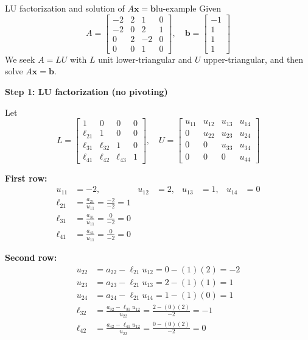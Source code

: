 \begin{example}{LU factorization and solution of $A\mathbf{x} = \mathbf{b}$}{lu-example}
Given
\[
A = \begin{bmatrix}
-2 & 2 & 1 & 0 \\
-2 & 0 & 2 & 1 \\
0 & 2 & -2 & 0 \\
0 & 0 & 1 & 0
\end{bmatrix},
\quad
\mathbf{b} = \begin{bmatrix}
-1 \\ 1 \\ 1 \\ 1
\end{bmatrix}
\]
We seek $A = LU$ with $L$ unit lower-triangular and $U$ upper-triangular, and then solve $A\mathbf{x} = \mathbf{b}$.

\textbf{Step 1: LU factorization (no pivoting)}

Let
\[
L = \begin{bmatrix}
1 & 0 & 0 & 0 \\
\ell_{21} & 1 & 0 & 0 \\
\ell_{31} & \ell_{32} & 1 & 0 \\
\ell_{41} & \ell_{42} & \ell_{43} & 1
\end{bmatrix},
\quad
U = \begin{bmatrix}
u_{11} & u_{12} & u_{13} & u_{14} \\
0 & u_{22} & u_{23} & u_{24} \\
0 & 0 & u_{33} & u_{34} \\
0 & 0 & 0 & u_{44}
\end{bmatrix}
\]

\textbf{First row:}
\begin{align*}
u_{11} &= -2, & u_{12} &= 2, & u_{13} &= 1, & u_{14} &= 0 \\
\ell_{21} &= \frac{a_{21}}{u_{11}} = \frac{-2}{-2} = 1 \\
\ell_{31} &= \frac{a_{31}}{u_{11}} = \frac{0}{-2} = 0 \\
\ell_{41} &= \frac{a_{41}}{u_{11}} = \frac{0}{-2} = 0
\end{align*}

\textbf{Second row:}
\begin{align*}
u_{22} &= a_{22} - \ell_{21} u_{12} = 0 - (1)(2) = -2 \\
u_{23} &= a_{23} - \ell_{21} u_{13} = 2 - (1)(1) = 1 \\
u_{24} &= a_{24} - \ell_{21} u_{14} = 1 - (1)(0) = 1 \\
\ell_{32} &= \frac{a_{32} - \ell_{31} u_{12}}{u_{22}} = \frac{2 - (0)(2)}{-2} = -1 \\
\ell_{42} &= \frac{a_{42} - \ell_{41} u_{12}}{u_{22}} = \frac{0 - (0)(2)}{-2} = 0
\end{align*}


\end{example}
